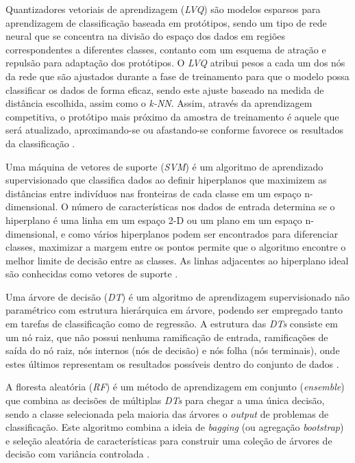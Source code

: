 \documentclass[journal]{IEEEtran}
\begin{document}
Quantizadores vetoriais de aprendizagem (\textit{LVQ}) são modelos esparsos para aprendizagem de classificação baseada em protótipos, sendo um tipo de rede neural que se concentra na divisão do espaço dos dados em regiões correspondentes a diferentes classes, contanto com um esquema de atração e repulsão para adaptação dos protótipos. O \textit{LVQ} atribui pesos a cada um dos nós da rede que são ajustados durante a fase de treinamento para que o modelo possa classificar os dados de forma eficaz, sendo este ajuste baseado na medida de distância escolhida, assim como o \textit{k-NN}. Assim, através da aprendizagem competitiva, o protótipo mais próximo da amostra de treinamento é aquele que será atualizado, aproximando-se ou afastando-se conforme favorece os resultados da classificação \cite{wong, meyer}.

Uma máquina de vetores de suporte (\textit{SVM}) é um algoritmo de aprendizado supervisionado que classifica dados ao definir hiperplanos que maximizem as distâncias entre indivíduos nas fronteiras de cada classe em um espaço n-dimensional. O número de características nos dados de entrada determina se o hiperplano é uma linha em um espaço 2-D ou um plano em um espaço n-dimensional, e como vários hiperplanos podem ser encontrados para diferenciar classes, maximizar a margem entre os pontos permite que o algoritmo encontre o melhor limite de decisão entre as classes. As linhas adjacentes ao hiperplano ideal são conhecidas como vetores de suporte \cite{ibm2023}.

Uma árvore de decisão (\textit{DT}) é um algoritmo de aprendizagem supervisionado não paramétrico com estrutura hierárquica em árvore, podendo ser empregado tanto em tarefas de classificação como de regressão. A estrutura das \textit{DTs} consiste em um nó raiz, que não possui nenhuma ramificação de entrada, ramificações de saída do nó raiz, nós internos (nós de decisão) e nós folha (nós terminais), onde estes últimos representam os resultados possíveis dentro do conjunto de dados \cite{ibm2024c}.

A floresta aleatória (\textit{RF}) é um método de aprendizagem em conjunto (\textit{ensemble}) que combina as decisões de múltiplas \textit{DTs} para chegar a uma única decisão, sendo a classe selecionada pela maioria das árvores o \textit{output} de problemas de classificação. Este algoritmo combina a ideia de \textit{bagging} (ou agregação \textit{bootstrap}) e seleção aleatória de características para construir uma coleção de árvores de decisão com variância controlada \cite{ibm2024d}.
\end{document}
